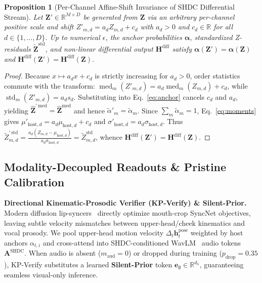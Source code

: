 \documentclass[10pt,twocolumn]{article}
\newtheorem{proposition}{Proposition}
\begin{document}
\begin{proposition}[Per-Channel Affine-Shift Invariance of SHDC Differential Stream]
\label{prop:affine}
Let $\mathbf{Z}' \in \mathbb{R}^{M \times D}$ be generated from $\mathbf{Z}$ via an arbitrary per-channel positive scale and shift $Z'_{m,d} = a_d Z_{m,d} + c_d$ with $a_d > 0$ and $c_d \in \mathbb{R}$ for all $d \in \{1,\dots,D\}$. Up to numerical $\epsilon$, the anchor probabilities $\boldsymbol{\alpha}$, standardized Z-residuals $\tilde{\mathbf{Z}}^{\text{std}}$, and non-linear differential output $\mathbf{H}^{\text{diff}}$ satisfy $\boldsymbol{\alpha}(\mathbf{Z}') = \boldsymbol{\alpha}(\mathbf{Z})$ and $\mathbf{H}^{\text{diff}}(\mathbf{Z}') = \mathbf{H}^{\text{diff}}(\mathbf{Z})$.
\end{proposition}
\begin{proof}
Because $x \mapsto a_d x + c_d$ is strictly increasing for $a_d > 0$, order statistics commute with the transform: $\operatorname{med}_m(Z'_{m,d}) = a_d \operatorname{med}_m(Z_{m,d}) + c_d$, while $\operatorname{std}_m(Z'_{m,d}) = a_d s_d$. Substituting into Eq.~\eqref{eq:anchor} cancels $c_d$ and $a_d$, yielding $\hat{\mathbf{Z}}^{\prime\,\text{med}} = \hat{\mathbf{Z}}^{\text{med}}$ and hence $\tilde{\alpha}'_m = \tilde{\alpha}_m$. Since $\sum_m \tilde{\alpha}_m = 1$, Eq.~\eqref{eq:moments} gives $\mu'_{\text{host},d} = a_d \mu_{\text{host},d} + c_d$ and $\sigma'_{\text{host},d} = a_d \sigma_{\text{host},d}$. Thus $\tilde{Z}^{\prime\,\text{std}}_{m,d} = \frac{a_d(Z_{m,d}-\mu_{\text{host},d})}{a_d\sigma_{\text{host},d}} = \tilde{Z}^{\text{std}}_{m,d}$, whence $\mathbf{H}^{\text{diff}}(\mathbf{Z}') = \mathbf{H}^{\text{diff}}(\mathbf{Z})$.
\end{proof}

\subsection{Modality-Decoupled Readouts \& Pristine Calibration}
\label{subsec:heads}
\noindent\textbf{Directional Kinematic-Prosodic Verifier (KP-Verify) \& Silent-Prior.} Modern diffusion lip-syncers~\cite{li2024latentsync} directly optimize mouth-crop SyncNet objectives, leaving subtle velocity mismatches between upper-head/cheek kinematics and vocal prosody. We pool upper-head motion velocity $\Delta_t \mathbf{h}_t^{\text{pose}}$ weighted by host anchors $\alpha_{t,i}$ and cross-attend into SHDC-conditioned WavLM~\cite{chen2022wavlm} audio tokens $\mathbf{A}^{\text{SHDC}}$. When audio is absent ($m_{\text{aud}}=0$) or dropped during training ($p_{\text{drop}}=0.35$), KP-Verify substitutes a learned \textbf{Silent-Prior} token $\mathbf{e}_\emptyset \in \mathbb{R}^{d_h}$, guaranteeing seamless visual-only inference.
\end{document}
